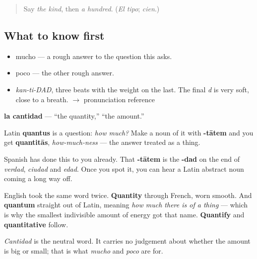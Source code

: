 \label{lesson:ES-C351-cantidad}



\begin{quote}
Say \emph{the kind}, then \emph{a hundred}. (\emph{El tipo}; \emph{cien}.)
\end{quote}

\subsection*{What to know first}
\begin{itemize}
\raggedright
  \item mucho — a rough answer to the question this asks.
  \item poco — the other rough answer.
\end{itemize}

\begin{sounds}
\begin{itemize}
\raggedright
  \item \emph{kan-ti-DAD}, three beats with the weight on the last. The final \emph{d} is very soft, close to a breath. $\to$ pronunciation reference
\end{itemize}
\end{sounds}

\begin{cousinweb}
\textbf{la cantidad} — \textquotedblleft{}the quantity,\textquotedblright{} \textquotedblleft{}the amount.\textquotedblright{}

Latin \textbf{quantus} is a question: \emph{how much?} Make a noun of it with \textbf{-tātem} and you get \textbf{quantitās}, \emph{how-much-ness} — the answer treated as a thing.

Spanish has done this to you already. That \textbf{-tātem} is the \textbf{-dad} on the end of \emph{verdad}, \emph{ciudad} and \emph{edad}. Once you spot it, you can hear a Latin abstract noun coming a long way off.

English took the same word twice. \textbf{Quantity} through French, worn smooth. And \textbf{quantum} straight out of Latin, meaning \emph{how much there is of a thing} — which is why the smallest indivisible amount of energy got that name. \textbf{Quantify} and \textbf{quantitative} follow.

\emph{Cantidad} is the neutral word. It carries no judgement about whether the amount is big or small; that is what \emph{mucho} and \emph{poco} are for.
\end{cousinweb}

